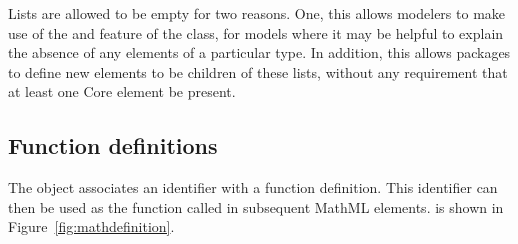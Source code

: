 \begin{blockChanged}
Lists are allowed to be empty for two reasons.  One, this allows modelers to make use of the \Annotation and \Notes feature of the class, for models where it may be helpful to explain the absence of any elements of a particular type.  In addition, this allows packages to define new elements to be children of these lists, without any requirement that at least one Core element be present.
\end{blockChanged}

\subsection{Function definitions}
\label{sec:functiondefinition}

The \FunctionDefinition object associates an identifier with a
function definition.  This identifier can then be used as the
function called in subsequent MathML  elements.
\FunctionDefinition is shown in Figure~\ref{fig:mathdefinition}.

